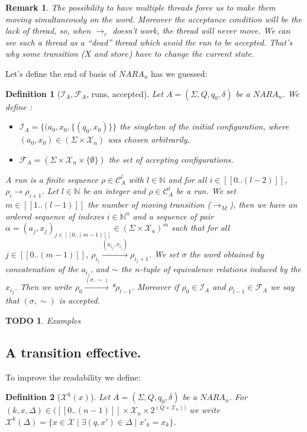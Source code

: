 \documentclass[a4paper,10pt]{report}
\newtheorem{df}{Definition}
\newtheorem{rk}{Remark}
\newtheorem{td}{TODO}
\newcommand{\seg}[1]{[\![#1]\!]}
\newcommand{\ts}{\seg{0 .. (n-1)}}
\newcommand{\C}{\mathcal{C}_{A}}
\newcommand{\I}{\mathcal{I}_{A}}
\newcommand{\F}{\mathcal{F}_{A}}
\newcommand{\Xa}{\mathcal{X}}
\newcommand{\X}{\mathcal{X}_{n}}
\begin{document}
\begin{rk}
  \label{dead}
  The possibility to have multiple threads force us to make them moving simultaneously on the word.
  Moreover the acceptance condition will be the lack of thread, so, when $\rightarrow_c$ doesn't work, the thread will never move.
  We can see such a thread as a ``dead'' thread which avoid the run to be accepted.
  That's why some transition ($X$ and $store$) have to change the current state.
\end{rk}
Let's define the end of basis of $NARA_n$ has we guessed:
\begin{df}[$\I,\F$, runs, accepted]
Let $A = (\Sigma ,Q ,q_0, \delta )$ be a $NARA_n$. We define :
\begin{itemize}
 \item $\I = \{(a_0,x_0,\{(q_0,x_0)\}\}$  the singleton of the initial configuration, where $(a_0,x_0) \in (\Sigma \times \X)$ was chosen arbitrarily.
 \item $\F = (\Sigma \times \X \times \{\emptyset\})$ the set of accepting configurations.
\end{itemize}
A run is a finite sequence $\rho \in \C^l$ with $l \in \mathbb N$ and for all $i \in \seg{0..(l-2)}$, $\rho_i \rightarrow \rho_{i+1}$.
Let $l \in \mathbb N$ be an integer and $\rho \in \C^l$  be a run.
We set $m \in \seg{1..(l-1)}$ the number of moving transition ($\rightarrow_M$), then we have an ordered sequence of indexes $i \in {\mathbb N}^n$ and a sequence of pair $\alpha = {(a_j,x_j)}_{j \in \seg{0..(m-1)}} \in {(\Sigma \times \X)}^m $
such that for all $j \in \seg{0..(m-1)}$, $\rho_{i_j} \xrightarrow{(a_{i_j},x_{i_j})} \rho_{i_j+1}$.
We set $\sigma$ the word obtained by concatenation of the $a_{i_j}$, and $\sim$ the $n$-tuple of equivalence relations induced by the $x_{i_j}$.
Then we write $\rho_0 \xrightarrow{(\sigma,\sim)}$*$ \rho_{l-1}$.
Moreover if $\rho_0 \in \I$ and $\rho_{l-1} \in \F$ we say that $(\sigma,\sim)$ is accepted.



\end{df}

\begin{td}
  Examples
\end{td}

\subsection{A transition effective.}

To improve the readability we define:
\begin{df}[$\Xa^k(x)$]
  Let $A = (\Sigma ,Q ,q_0, \delta )$ be a $NARA_n$.
  For $(k,x,\Delta) \in (\ts \times \X \times 2^{(Q\times \X)) } $ we write $\Xa^k(\Delta) = \{x \in \Xa \mid \exists (q,x') \in \Delta \mid x'_k = x_k\}$.
\end{df}
\end{document}
